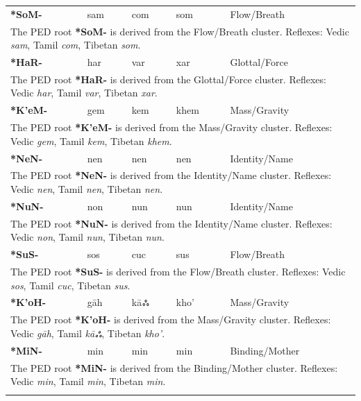 \begin{longtable}{p{} p{} p{} p{} p{}}
\textbf{*SoM-} & sam & com & som & Flow/Breath \\ 
\multicolumn{5}{p{\textwidth}}{\small The PED root \textbf{*SoM-} is derived from the Flow/Breath cluster. Reflexes: Vedic \textit{sam}, Tamil \textit{com}, Tibetan \textit{som}. } \\ \addlinespace 
\textbf{*HaR-} & har & var & xar & Glottal/Force \\ 
\multicolumn{5}{p{\textwidth}}{\small The PED root \textbf{*HaR-} is derived from the Glottal/Force cluster. Reflexes: Vedic \textit{har}, Tamil \textit{var}, Tibetan \textit{xar}. } \\ \addlinespace 
\textbf{*K'eM-} & gem & kem & khem & Mass/Gravity \\ 
\multicolumn{5}{p{\textwidth}}{\small The PED root \textbf{*K'eM-} is derived from the Mass/Gravity cluster. Reflexes: Vedic \textit{gem}, Tamil \textit{kem}, Tibetan \textit{khem}. } \\ \addlinespace 
\textbf{*NeN-} & nen & nen & nen & Identity/Name \\ 
\multicolumn{5}{p{\textwidth}}{\small The PED root \textbf{*NeN-} is derived from the Identity/Name cluster. Reflexes: Vedic \textit{nen}, Tamil \textit{nen}, Tibetan \textit{nen}. } \\ \addlinespace 
\textbf{*NuN-} & non & nun & nun & Identity/Name \\ 
\multicolumn{5}{p{\textwidth}}{\small The PED root \textbf{*NuN-} is derived from the Identity/Name cluster. Reflexes: Vedic \textit{non}, Tamil \textit{nun}, Tibetan \textit{nun}. } \\ \addlinespace 
\textbf{*SuS-} & sos & cuc & sus & Flow/Breath \\ 
\multicolumn{5}{p{\textwidth}}{\small The PED root \textbf{*SuS-} is derived from the Flow/Breath cluster. Reflexes: Vedic \textit{sos}, Tamil \textit{cuc}, Tibetan \textit{sus}. } \\ \addlinespace 
\textbf{*K'oH-} & gāh & kāஃ & kho' & Mass/Gravity \\ 
\multicolumn{5}{p{\textwidth}}{\small The PED root \textbf{*K'oH-} is derived from the Mass/Gravity cluster. Reflexes: Vedic \textit{gāh}, Tamil \textit{kāஃ}, Tibetan \textit{kho'}. } \\ \addlinespace 
\textbf{*MiN-} & min & min & min & Binding/Mother \\ 
\multicolumn{5}{p{\textwidth}}{\small The PED root \textbf{*MiN-} is derived from the Binding/Mother cluster. Reflexes: Vedic \textit{min}, Tamil \textit{min}, Tibetan \textit{min}. } \\ \addlinespace 

\end{longtable}
